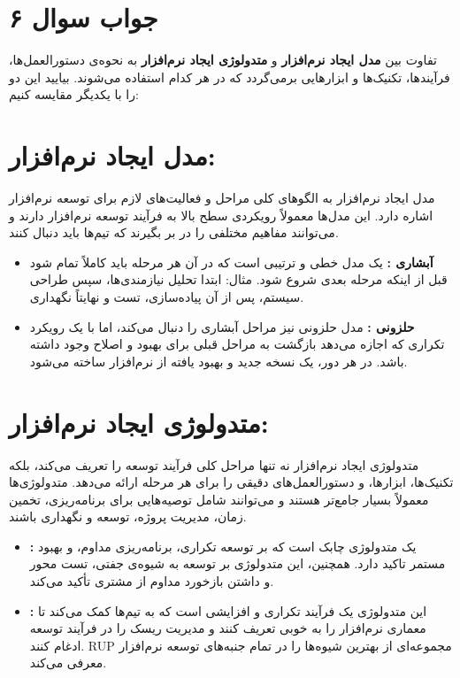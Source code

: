\section*{جواب سوال ۶}

تفاوت بین
\textbf{مدل ایجاد نرم‌افزار}
و
\textbf{متدولوژی ایجاد نرم‌افزار}
به نحوه‌ی دستورالعمل‌ها، فرآیندها، تکنیک‌ها و ابزارهایی برمی‌گردد که در هر کدام استفاده می‌شوند. بیایید این دو را با یکدیگر مقایسه کنیم:

\section*{مدل ایجاد نرم‌افزار:}

مدل ایجاد نرم‌افزار به الگوهای کلی مراحل و فعالیت‌های لازم برای توسعه نرم‌افزار اشاره دارد. این مدل‌ها معمولاً رویکردی سطح بالا به فرآیند توسعه نرم‌افزار دارند و می‌توانند مفاهیم مختلفی را در بر بگیرند که تیم‌ها باید دنبال کنند.

\begin{itemize}
	\item \textbf{آبشاری  :}
یک مدل خطی و ترتیبی است که در آن هر مرحله باید کاملاً تمام شود قبل از اینکه مرحله بعدی شروع شود. مثال: ابتدا تحلیل نیازمندی‌ها، سپس طراحی سیستم، پس از آن پیاده‌سازی، تست و نهایتاً نگهداری.
	\item \textbf{حلزونی  :}
مدل حلزونی نیز مراحل آبشاری را دنبال می‌کند، اما با یک رویکرد تکراری که اجازه می‌دهد بازگشت به مراحل قبلی برای بهبود و اصلاح وجود داشته باشد. در هر دور، یک نسخه جدید و بهبود یافته از نرم‌افزار ساخته می‌شود.
\end{itemize}

\section*{متدولوژی ایجاد نرم‌افزار:}

متدولوژی ایجاد نرم‌افزار نه تنها مراحل کلی فرآیند توسعه را تعریف می‌کند، بلکه تکنیک‌ها، ابزارها، و دستورالعمل‌های دقیقی را برای هر مرحله ارائه می‌دهد. متدولوژی‌ها معمولاً بسیار جامع‌تر هستند و می‌توانند شامل توصیه‌هایی برای برنامه‌ریزی، تخمین زمان، مدیریت پروژه، توسعه و نگهداری باشند.

\begin{itemize}
	\item \textbf{ :}
یک متدولوژی چابک است که بر توسعه تکراری، برنامه‌ریزی مداوم، و بهبود مستمر تاکید دارد. همچنین، این متدولوژی بر توسعه به شیوه‌ی جفتی، تست محور و داشتن بازخورد مداوم از مشتری تأکید می‌کند.

	\item \textbf{ :}
این متدولوژی یک فرآیند تکراری و افزایشی است که به تیم‌ها کمک می‌کند تا معماری نرم‌افزار را به خوبی تعریف کنند و مدیریت ریسک را در فرآیند توسعه ادغام کنند. RUP مجموعه‌ای از بهترین شیوه‌ها را در تمام جنبه‌های توسعه نرم‌افزار معرفی می‌کند.
\end{itemize}

